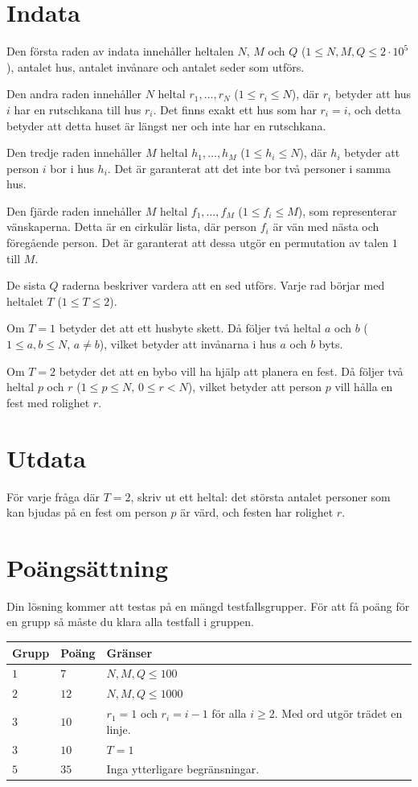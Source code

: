 \section*{Indata}
Den första raden av indata innehåller heltalen $N$, $M$ och $Q$ ($1 \leq N, M, Q \leq 2 \cdot 10^5$),
antalet hus, antalet invånare och antalet seder som utförs.

Den andra raden innehåller $N$ heltal $r_1, \dots, r_N$ ($1 \leq r_i \leq N$),
där $r_i$ betyder att hus $i$ har en rutschkana till hus $r_i$.
Det finns exakt ett hus som har $r_i=i$, och detta betyder att detta huset är längst ner och inte har en rutschkana.

Den tredje raden innehåller $M$ heltal $h_1, \dots, h_M$ ($1 \leq h_i \leq N$),
där $h_i$ betyder att person $i$ bor i hus $h_i$.
Det är garanterat att det inte bor två personer i samma hus.

Den fjärde raden innehåller $M$ heltal $f_1, \dots, f_M$ ($1 \leq f_i \leq M$),
som representerar vänskaperna. Detta är en cirkulär lista, där person $f_i$ är vän med
nästa och föregående person. Det är garanterat att dessa utgör en permutation av talen $1$ till $M$.

De sista $Q$ raderna beskriver vardera att en sed utförs. Varje rad börjar med heltalet $T$ ($1 \leq T \leq 2$).

Om $T=1$ betyder det att ett husbyte skett. Då följer två heltal $a$ och $b$ ($1 \leq a, b \leq N$, $a \neq b$),
vilket betyder att invånarna i hus $a$ och $b$ byts.

Om $T=2$ betyder det att en bybo vill ha hjälp att planera en fest. Då följer två heltal $p$ och $r$ ($1 \leq p \leq N$, $0 \leq r < N$),
vilket betyder att person $p$ vill hålla en fest med rolighet $r$.

\section*{Utdata}
För varje fråga där $T=2$, skriv ut ett heltal: det största antalet personer som kan bjudas på en fest
om person $p$ är värd, och festen har rolighet $r$.

\section*{Poängsättning}
Din lösning kommer att testas på en mängd testfallsgrupper.
För att få poäng för en grupp så måste du klara alla testfall i gruppen.

\noindent
\begin{tabular}{| l | l | p{12cm} |}
  \hline
  \textbf{Grupp} & \textbf{Poäng} & \textbf{Gränser} \\ \hline
  $1$    & $7$   & $N,M,Q \leq 100$ \\ \hline
  $2$    & $12$  & $N,M,Q \leq 1000$ \\ \hline
  $3$    & $10$  & $r_1=1$ och $r_i=i-1$ för alla $i \geq 2$. Med ord utgör trädet en linje. \\ \hline
  $3$    & $10$  & $T=1$ \\ \hline
  $5$    & $35$  & Inga ytterligare begränsningar. \\ \hline
\end{tabular}

